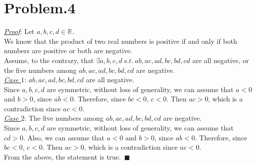 \documentclass[12pt]{article}
\begin{document}
\section*{Problem.4}
\underline{\textit{Proof}}: Let $a, b, c, d \in \mathbb{R}$.\\[1em]
We know that the product of  two real numbers is positive if and only if both numbers are positive or both are negative.\\[1em]
Assume, to the contrary, that $\exists a, b, c, d ~s.t.~ ab, ac, ad, bc, bd, cd$ are all negative, or the five numbers among $ab, ac, ad, bc, bd, cd$ are negative.\\[1em]
\underline{\textit{Case $1$}}: $ab, ac, ad, bc, bd, cd$ are all negative.\\[1em]
Since $a,b,c,d$ are symmetric, without loss of generality, we can assume that $a < 0$ and $b > 0$, since $ab < 0$. Therefore, since $bc < 0$, $c < 0$. Then $ac > 0$, which is a contradiction since $ac < 0$.\\[1em]
\underline{\textit{Case $2$}}: The five numbers among $ab, ac, ad, bc, bd, cd$ are negative.\\[1em]
Since $a,b,c,d$ are symmetric, without loss of generality, we can assume that $cd > 0$. Also, we can assume that $a < 0$ and $b > 0$, since $ab < 0$. Therefore, since $bc < 0$, $c < 0$. Then $ac > 0$, which is a contradiction since $ac < 0$.\\[1em]
From the above, the statement is true.~$\blacksquare$
\end{document}
